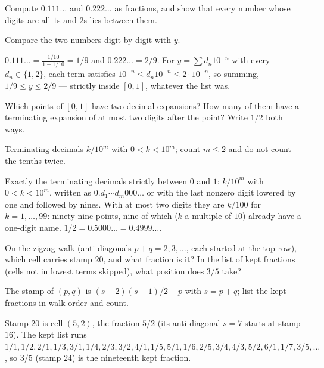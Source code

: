\begin{problem}
Compute $0.111\ldots$ and $0.222\ldots$ as fractions, and show that
every number whose digits are all $1$s and $2$s lies between them.
\begin{hint}
Compare the two numbers digit by digit with $y$.
\end{hint}
\begin{solution}
$0.111\ldots = \tfrac{1/10}{1 - 1/10} = 1/9$ and $0.222\ldots = 2/9$.
For $y = \sum d_n 10^{-n}$ with every $d_n \in \{1, 2\}$, each term
satisfies $10^{-n} \le d_n 10^{-n} \le 2 \cdot 10^{-n}$, so summing,
$1/9 \le y \le 2/9$ — strictly inside $[0,1]$, whatever the list was.
\end{solution}
\end{problem}

\begin{problem}
Which points of $[0,1]$ have two decimal expansions? How many of them
have a terminating expansion of at most two digits after the point?
Write $1/2$ both ways.
\begin{hint}
Terminating decimals $k/10^m$ with $0 < k < 10^m$; count $m \le 2$ and
do not count the tenths twice.
\end{hint}
\begin{solution}
Exactly the terminating decimals strictly between $0$ and $1$: $k/10^m$
with $0 < k < 10^m$, written as $0.d_1 \cdots d_m 000\ldots$ or with
the last nonzero digit lowered by one and followed by nines. With at
most two digits they are $k/100$ for $k = 1, \ldots, 99$: ninety-nine
points, nine of which ($k$ a multiple of $10$) already have a one-digit
name. $1/2 = 0.5000\ldots = 0.4999\ldots$.
\end{solution}
\end{problem}

\begin{problem}
On the zigzag walk (anti-diagonals $p + q = 2, 3, \ldots$, each started
at the top row), which cell carries stamp $20$, and what fraction is
it? In the list of kept fractions (cells not in lowest terms skipped),
what position does $3/5$ take?
\begin{hint}
The stamp of $(p, q)$ is $(s-2)(s-1)/2 + p$ with $s = p + q$; list the
kept fractions in walk order and count.
\end{hint}
\begin{solution}
Stamp $20$ is cell $(5, 2)$, the fraction $5/2$ (its anti-diagonal
$s = 7$ starts at stamp $16$). The kept list runs $1/1, 1/2, 2/1, 1/3,
3/1, 1/4, 2/3, 3/2, 4/1, 1/5, 5/1, 1/6, 2/5, 3/4, 4/3, 5/2, 6/1, 1/7,
3/5, \ldots$, so $3/5$ (stamp $24$) is the nineteenth kept fraction.
\end{solution}
\end{problem}

